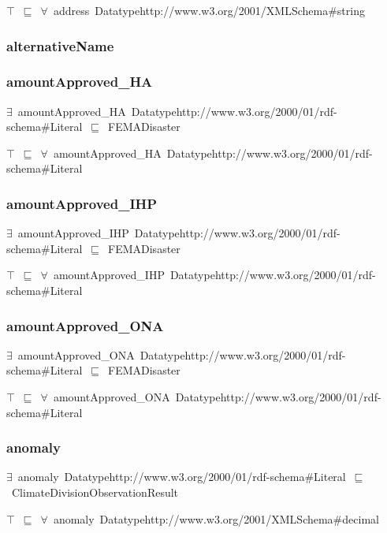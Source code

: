 \documentclass{article}
\begin{document}
\ensuremath{\top}~\ensuremath{\sqsubseteq}~\ensuremath{\forall}~address~Datatypehttp://www.w3.org/2001/XMLSchema#string

\subsubsection*{alternativeName}

\subsubsection*{amountApproved\_HA}

\ensuremath{\exists}~amountApproved\_HA~Datatypehttp://www.w3.org/2000/01/rdf-schema#Literal~\ensuremath{\sqsubseteq}~FEMADisaster

\ensuremath{\top}~\ensuremath{\sqsubseteq}~\ensuremath{\forall}~amountApproved\_HA~Datatypehttp://www.w3.org/2000/01/rdf-schema#Literal

\subsubsection*{amountApproved\_IHP}

\ensuremath{\exists}~amountApproved\_IHP~Datatypehttp://www.w3.org/2000/01/rdf-schema#Literal~\ensuremath{\sqsubseteq}~FEMADisaster

\ensuremath{\top}~\ensuremath{\sqsubseteq}~\ensuremath{\forall}~amountApproved\_IHP~Datatypehttp://www.w3.org/2000/01/rdf-schema#Literal

\subsubsection*{amountApproved\_ONA}

\ensuremath{\exists}~amountApproved\_ONA~Datatypehttp://www.w3.org/2000/01/rdf-schema#Literal~\ensuremath{\sqsubseteq}~FEMADisaster

\ensuremath{\top}~\ensuremath{\sqsubseteq}~\ensuremath{\forall}~amountApproved\_ONA~Datatypehttp://www.w3.org/2000/01/rdf-schema#Literal

\subsubsection*{anomaly}

\ensuremath{\exists}~anomaly~Datatypehttp://www.w3.org/2000/01/rdf-schema#Literal~\ensuremath{\sqsubseteq}~ClimateDivisionObservationResult

\ensuremath{\top}~\ensuremath{\sqsubseteq}~\ensuremath{\forall}~anomaly~Datatypehttp://www.w3.org/2001/XMLSchema#decimal
\end{document}
